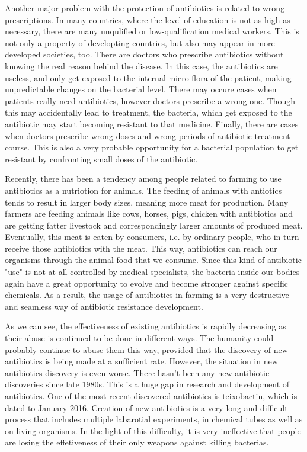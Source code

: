 Another major problem with the protection of antibiotics is related to wrong prescriptions. In many countries, where the level of education is not as high as necessary, there are many unqulified or low-qualification medical workers. This is not only a property of developting countries, but also may appear in more developed societies, too. There are doctors who prescribe antibiotics without knowing the real reason behind the disease. In this case, the antibiotics are useless, and only get exposed to the internal micro-flora of the patient, making unpredictable changes on the bacterial level. There may occure cases when patients really need antibiotics, however doctors prescribe a wrong one. Though this may accidentally lead to treatment, the bacteria, which get exposed to the antibiotic may start becoming resistant to that medicine. Finally, there are cases when doctors prescribe wrong doses and wrong periods of antibiotic treatment course. This is also a very probable opportunity for a bacterial population to get resistant by confronting small doses of the antibiotic.

Recently, there has been a tendency among people related to farming to use antibiotics as a nutriotion for animals. The feeding of animals with antiotics tends to result in larger body sizes, meaning more meat for production. Many farmers are feeding animals like cows, horses, pigs, chicken with antibiotics and are getting fatter livestock and correspondingly larger amounts of produced meat. Eventually, this meat is eaten by consumers, i.e. by ordinary people, who in turn receive those antibiotics with the meat. This way, antibiotics can reach our organisms through the animal food that we consume. Since this kind of antibiotic "use" is not at all controlled by medical specialists, the bacteria inside our bodies again have a great opportunity to evolve and become stronger against specific chemicals. As a result, the usage of antibiotics in farming is a very destructive and seamless way of antibiotic resistance development.

As we can see, the effectiveness of existing antibiotics is rapidly decreasing as their abuse is continued to be done in different ways. The humanity could probably continue to abuse them this way, provided that the discovery of new antibiotics is being made at a sufficient rate. However, the situation in new antibiotics discovery is even worse. There hasn't been any new antibiotic discoveries since late 1980s. This is a huge gap in research and development of antibiotics. One of the most recent discovered antibiotics is teixobactin, which is dated to January 2016. Creation of new antibiotics is a very long and difficult process that includes multiple labarotial experiments, in chemical tubes as well as on living organisms. In the light of this difficulty, it is very ineffective that people are losing the effetiveness of their only weapons against killing bacterias.

